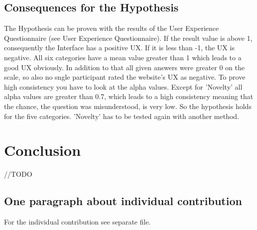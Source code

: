 \documentclass{sigchi}
\begin{document}
\subsection{Consequences for the Hypothesis}
The Hypothesis can be proven with the results of the User Experience Questionnaire (see User Experience Questionnaire). If the result value is above 1, consequently the Interface has a positive UX. If it is less than -1, the UX is negative. All six categories have a mean value greater than 1 which leads to a good UX obviously. In addition to that all given answers were greater 0 on the scale, so also no sngle participant rated the website's UX as negative. To prove high consistency you have to look at the alpha values. Except for 'Novelty' all alpha values are greater than 0.7, which leads to a high consistency meaning that the chance, the question was misunderstood, is very low. So the hypothesis holds for the five categories. 'Novelty' has to be tested again with another method. 

\section{Conclusion}
//TODO

\subsection{One paragraph about individual
contribution}
For the individual contribution see separate file. 

\balance{}



\end{document}
